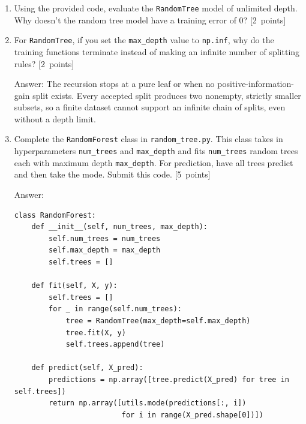\documentclass{article}
\newcommand{\blu}[1]{{\textcolor{blu}{#1}}}
\let\ask\blu
\newcommand\pts[1]{\textcolor{pointscolour}{[#1~points]}}
\begin{document}
    \begin{enumerate}
        \item Using the provided code, evaluate the \texttt{RandomTree} model of unlimited depth. \ask{Why doesn't the random tree model have a training error of 0?} \pts{2}

        \item For \texttt{RandomTree}, if you set the \texttt{max\_depth} value to \texttt{np.inf}, \ask{why do the training functions terminate instead of making an infinite number of splitting rules?} \pts{2}
        \par\noindent\textcolor{gre}{Answer:}
The recursion stops at a pure leaf or when no positive-information-gain split exists. Every accepted split produces two nonempty, strictly smaller subsets, so a finite dataset cannot support an infinite chain of splits, even without a depth limit.

                
        \item Complete the \texttt{RandomForest} class in \texttt{random\string_tree.py}. This class takes in hyperparameters \texttt{num\string_trees} and \texttt{max\string_depth} and
        fits \texttt{num\string_trees} random trees each with maximum depth \texttt{max\string_depth}. For prediction, have all trees predict and then take the mode. \ask{Submit this code.} \pts{5}
        \par\noindent\textcolor{gre}{Answer:}
\begin{lstlisting}
class RandomForest:
    def __init__(self, num_trees, max_depth):
        self.num_trees = num_trees
        self.max_depth = max_depth
        self.trees = []

    def fit(self, X, y):
        self.trees = []
        for _ in range(self.num_trees):
            tree = RandomTree(max_depth=self.max_depth)
            tree.fit(X, y)
            self.trees.append(tree)

    def predict(self, X_pred):
        predictions = np.array([tree.predict(X_pred) for tree in self.trees])
        return np.array([utils.mode(predictions[:, i])
                         for i in range(X_pred.shape[0])])
\end{lstlisting}


\end{enumerate}
\end{document}
